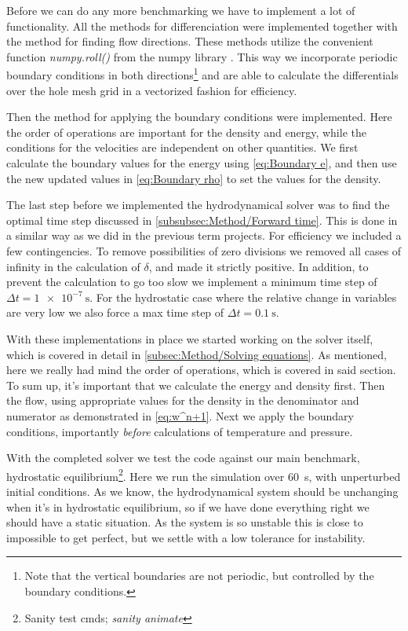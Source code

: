 \documentclass[11pt,a4paper,twocolumn,titlepage]{article}
\begin{document}
Before we can do any more benchmarking we have to implement a lot of functionality. All the methods for differenciation were implemented together with the method for finding flow directions. These methods utilize the convenient function \textit{numpy.roll()} from the numpy library \citep{roll_docs}. This way we incorporate periodic boundary conditions in both directions\footnote{Note that the vertical boundaries are not periodic, but controlled by the boundary conditions.} and are able to calculate the differentials over the hole mesh grid in a vectorized fashion for efficiency.

Then the method for applying the boundary conditions were implemented. Here the order of operations are important for the density and energy, while the conditions for the velocities are independent on other quantities. We first calculate the boundary values for the energy using \cref{eq:Boundary e}, and then use the new updated values in \cref{eq:Boundary rho} to set the values for the density.

The last step before we implemented the hydrodynamical solver was to find the optimal time step discussed in \cref{subsubsec:Method/Forward time}. This is done in a similar way as we did in the previous term projects. For efficiency we included a few contingencies. To remove possibilities of zero divisions we removed all cases of infinity in the calculation of $\delta$, and made it strictly positive. In addition, to prevent the calculation to go too slow we implement a minimum time step of $\Delta t = \SI{1e-7}{\s}$. For the hydrostatic case where the relative change in variables are very low we also force a max time step of $\Delta t = \SI{0.1}{\s}$.

With these implementations in place we started working on the solver itself, which is covered in detail in \cref{subsec:Method/Solving equations}. As mentioned, here we really had mind the order of operations, which is covered in said section. To sum up, it's important that we calculate the energy and density first. Then the flow, using appropriate values for the density in the denominator and numerator as demonstrated in \cref{eq:w^n+1}. Next we apply the boundary conditions, importantly \textit{before} calculations of temperature and pressure.

With the completed solver we test the code against our main benchmark, hydrostatic equilibrium\footnote{Sanity test cmds; \textit{sanity animate}}. Here we run the simulation over \SI{60}{\s}, with unperturbed initial conditions. As we know, the hydrodynamical system should be unchanging when it's in hydrostatic equilibrium, so if we have done everything right we should have a static situation. As the system is so unstable this is close to impossible to get perfect, but we  settle with a low tolerance for instability.
\end{document}
